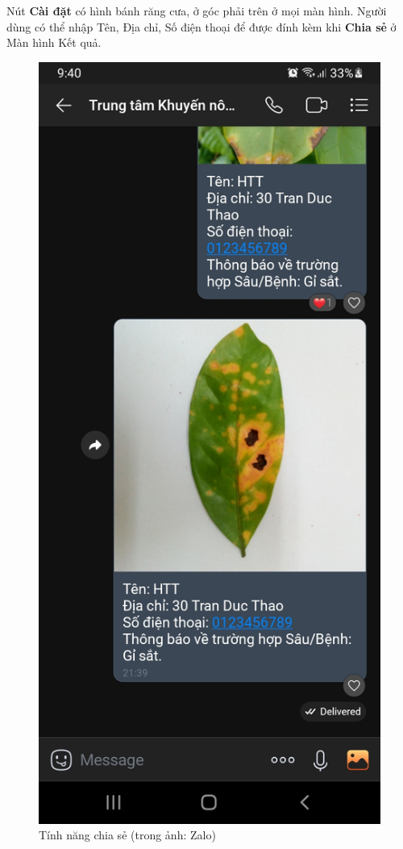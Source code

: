 \documentclass[a4paper,14pt]{extarticle}
\begin{document}
	Nút \textbf{Cài đặt} có hình bánh răng cưa, ở góc phải trên ở mọi màn hình. Người dùng có thể nhập Tên, Địa chỉ, Số điện thoại để được đính kèm khi \textbf{Chia sẻ} ở Màn hình Kết quả.

	\begin{figure}[H]
		\centering
		\includegraphics[scale=0.14]{images/screenshot5.jpg}
		\caption{Tính năng chia sẻ (trong ảnh: Zalo)}
	\end{figure}
\end{document}
